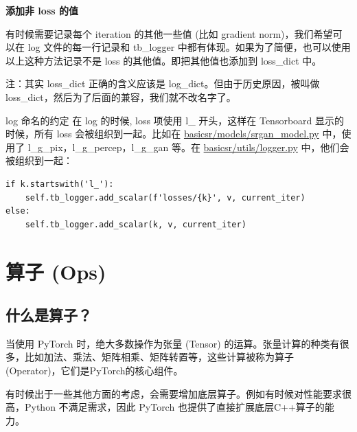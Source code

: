 \documentclass[../main.tex]{subfiles}
\begin{document}
\begin{note} %
    \textbf{添加非 loss 的值}

    有时候需要记录每个 iteration 的其他一些值 (比如 gradient norm)，我们希望可以在 log 文件的每一行记录和 tb\_logger 中都有体现。如果为了简便，也可以使用以上这种方法记录不是 loss 的其他值。即把其他值也添加到 loss\_dict 中。

    注：其实 loss\_dict 正确的含义应该是 log\_dict。但由于历史原因，被叫做 loss\_dict，然后为了后面的兼容，我们就不改名字了。
\end{note}

\begin{exampleBox}[righthand ratio=0.00, sidebyside, sidebyside align=center, lower separated=false]{log 命名的约定}
    在 log 的时候, loss 项使用 l\_ 开头，这样在 Tensorboard 显示的时候，所有 loss 会被组织到一起。比如在 \href{https://github.com/XPixelGroup/BasicSR/blob/master/basicsr/models/srgan_model.py}{basicsr/models/srgan\_model.py} 中，使用了 l\_g\_pix，l\_g\_percep，l\_g\_gan 等。在 \href{https://github.com/XPixelGroup/BasicSR/blob/master/basicsr/utils/logger.py}{basicsr/utils/logger.py} 中，他们会被组织到一起：
    \begin{verbatim}
if k.startswith('l_'):
    self.tb_logger.add_scalar(f'losses/{k}', v, current_iter)
else:
    self.tb_logger.add_scalar(k, v, current_iter)
\end{verbatim}
\end{exampleBox}

\section{算子 (Ops)}\label{code_structure:ops}

\subsection{什么是算子？}

当使用 PyTorch 时，绝大多数操作为张量 (Tensor) 的运算。张量计算的种类有很多，比如加法、乘法、矩阵相乘、矩阵转置等，这些计算被称为算子 (Operator)，它们是PyTorch的核心组件。

有时候出于一些其他方面的考虑，会需要增加底层算子。例如有时候对性能要求很高，Python 不满足需求，因此 PyTorch 也提供了直接扩展底层C++算子的能力。
\end{document}
